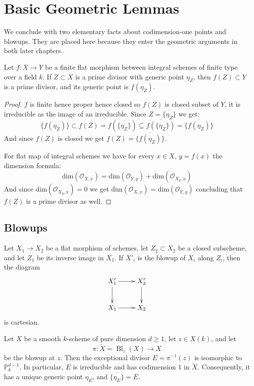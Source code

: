 \section{Basic Geometric Lemmas}

We conclude with two elementary facts about codimension-one points and
blowups. They are placed here because they enter the geometric arguments in
both later chapters.

\begin{prop}\label{prop:finite_flat_prime_divisor}
Let $f:X\to Y$ be a finite flat morphism between integral schemes of finite
type over a field $k$. If $Z\subset X$ is a prime divisor with generic point
$\eta_Z$, then $f(Z)\subset Y$ is a prime divisor, and its generic point is
$f(\eta_Z)$.
\end{prop}

\begin{proof}
    $f$ is finite hence proper hence closed so $f(Z)$ is closed subset of $Y$, it is irreducible as the image of an irreducible.
    Since $Z = \overline{\{ \eta_Z \}}$ we get:
    $$\{f(\eta_Z)\} \subset f(Z) = f(\overline{\{\eta_Z\}}) \subseteq \overline{f(\{\eta_Z\})} = \overline{\{f(\eta_Z)\}}$$
    And since $f(Z)$ is closed we get $f(Z) = \overline{\{f(\eta_Z)\}}$.

    For flat map of integral schemes we have for every $x \in X$, $y=f(x)$ the dimension formula:
    $$\text{dim}(\mathcal{O}_{X,x}) = \text{dim}(\mathcal{O}_{Y,y}) + \text{dim}(\mathcal{O}_{X_y, x})$$
    And since $\text{dim}(\mathcal{O}_{X_y, x}) = 0$ we get $\text{dim}(\mathcal{O}_{X,x}) = \text{dim}(\mathcal{O}_{Y,y})$
    concluding that $f(Z)$ is a prime divisor as well.
\end{proof}

\subsection*{Blowups}

\begin{theorem}[\stackstag{0805}]\label{theorem:blowup_flat_base_change}
Let $X_1\to X_2$ be a flat morphism of schemes, let $Z_2\subset X_2$ be a
closed subscheme, and let $Z_1$ be its inverse image in $X_1$. If $X'_i$ is
the blowup of $X_i$ along $Z_i$, then the diagram
\[
\xymatrix{
X'_1 \ar[r] \ar[d] & X'_2 \ar[d] \\
X_1 \ar[r] & X_2
}
\]
is cartesian.
\end{theorem}

\begin{prop}\label{prop:exceptional_divisor_smooth_point}
Let $X$ be a smooth $k$-scheme of pure dimension $d\geq 1$, let $z\in X(k)$, and
let
\[
\pi:\widetilde X=\operatorname{Bl}_z(X)\longrightarrow X
\]
be the blowup at $z$. Then the exceptional divisor
$E=\pi^{-1}(z)$ is isomorphic to $\mathbb P_k^{d-1}$. In particular, $E$ is
irreducible and has codimension $1$ in $\widetilde X$. Consequently, it has
a unique generic point $\eta_E$, and $\overline{\{\eta_E\}}=E$.
\end{prop}

